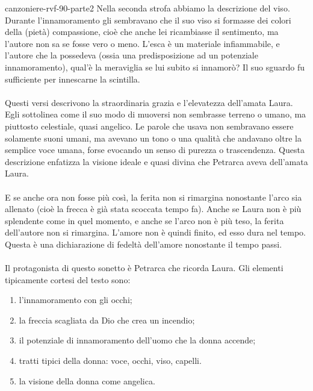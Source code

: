 \documentclass[preview]{standalone}
\begin{document}
\begin{snippet}{canzoniere-rvf-90-parte2}
     Nella seconda strofa abbiamo la descrizione del viso.
    Durante l'innamoramento gli sembravano che il suo viso si formasse dei colori della (pietà) compassione,
    cioè che anche lei ricambiasse il sentimento, ma l'autore non sa se fosse vero o meno.
    L'esca è un materiale infiammabile, e l'autore che la possedeva (ossia una predisposizione ad un potenziale innamoramento),
    qual'è la meraviglia se lui subito si innamorò? Il suo sguardo fu sufficiente per innescarne la scintilla.
    \\\\
     Questi versi descrivono la straordinaria grazia e l'elevatezza dell'amata Laura.
    Egli sottolinea come il suo modo di muoversi non sembrasse terreno o umano, ma piuttosto celestiale,
    quasi angelico. Le parole che usava non sembravano essere solamente suoni umani,
    ma avevano un tono o una qualità che andavano oltre la semplice voce umana, forse evocando
    un senso di purezza o trascendenza.
    Questa descrizione enfatizza la visione ideale e quasi divina che Petrarca aveva dell'amata Laura.
    \\\\
     E se anche ora non fosse più così, la ferita non si rimargina nonostante l'arco sia allenato (cioè la frecca è già stata scoccata tempo fa).
    Anche se Laura non è più splendente come in quel momento, e anche se l'arco non è più teso, la ferita dell'autore non si rimargina.
    L'amore non è quindi finito, ed esso dura nel tempo. Questa è una dichiarazione di fedeltà dell'amore nonostante il tempo passi.
    \\\\
    Il protagonista di questo sonetto è Petrarca che ricorda Laura.
    Gli elementi tipicamente cortesi del testo sono:
    \begin{enumerate}
        \item l'innamoramento con gli occhi;
        \item la freccia scagliata da Dio che crea un incendio;
        \item il potenziale di innamoramento dell'uomo che la donna accende;
        \item tratti tipici della donna: voce, occhi, viso, capelli.
        \item la visione della donna come angelica.
    \end{enumerate}


\end{snippet}
\end{document}
